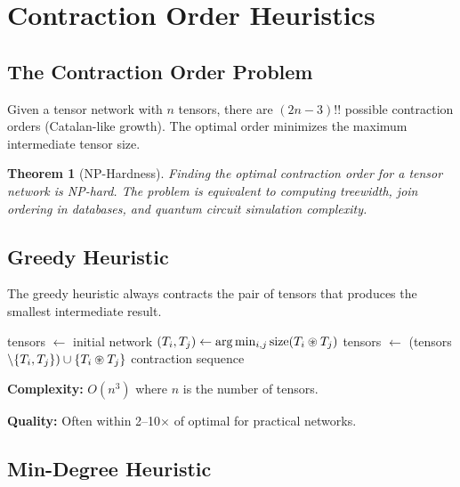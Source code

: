 \documentclass[11pt,a4paper]{article}
\newtheorem{theorem}{Theorem}
\begin{document}
\section{Contraction Order Heuristics}
\label{sec:heuristics_chirho}

\subsection{The Contraction Order Problem}

Given a tensor network with $n$ tensors, there are $(2n-3)!!$ possible contraction orders
(Catalan-like growth). The optimal order minimizes the maximum intermediate tensor size.

\begin{theorem}[NP-Hardness]
Finding the optimal contraction order for a tensor network is NP-hard.
The problem is equivalent to computing treewidth, join ordering in databases,
and quantum circuit simulation complexity.
\end{theorem}

\subsection{Greedy Heuristic}

The greedy heuristic always contracts the pair of tensors that produces the smallest intermediate result.

\begin{algorithm}[ht]
\caption{Greedy Contraction Order}
\label{alg:greedy_chirho}
\begin{algorithmic}[1]
\State tensors $\gets$ initial network
  \State $(T_i, T_j) \gets \arg\min_{i,j} \text{size}(T_i \circledast T_j)$
  \State tensors $\gets$ (tensors $\setminus \{T_i, T_j\}) \cup \{T_i \circledast T_j\}$
\EndWhile
\State \Return contraction sequence
\end{algorithmic}
\end{algorithm}

\textbf{Complexity:} $O(n^3)$ where $n$ is the number of tensors.

\textbf{Quality:} Often within 2--10$\times$ of optimal for practical networks.

\subsection{Min-Degree Heuristic}
\end{document}
